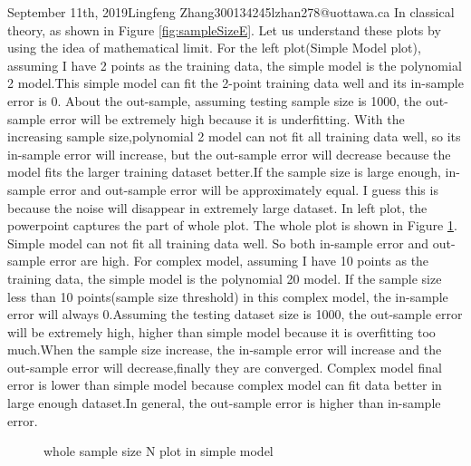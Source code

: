 \documentclass{article}
\begin{document}
\begin{lecture}{September 11th, 2019}{Lingfeng Zhang}{300134245}{lzhan278@uottawa.ca}
In classical theory, as shown in Figure \ref{fig:sampleSizeE}. Let us understand these plots by using the idea of mathematical limit. For the left plot(Simple Model plot), assuming I have 2 points as the training data, the simple model is the polynomial 2 model.This simple model can fit the 2-point training data well and its in-sample error is 0. About the out-sample, assuming testing sample size is 1000, the out-sample error will be extremely high because it is underfitting. With the increasing sample size,polynomial 2 model can not fit all training data well, so its in-sample error will increase, but the out-sample error will decrease because the model fits the larger training dataset better.If the sample size is large enough, in-sample error and out-sample error will be approximately equal. I guess this is because the noise will disappear in extremely large dataset. In left plot, the powerpoint captures the part of whole plot. The whole plot is shown in Figure \ref{fig:wholeSampleSizeE}. Simple model can not fit all training data well. So both in-sample error and out-sample error are high. For complex model, assuming I have 10 points as the training data, the simple model is the polynomial 20 model. If the sample size less than 10 points(sample size threshold) in this complex model, the in-sample error will always 0.Assuming the testing dataset size is 1000, the out-sample error will be extremely high, higher than simple model because it is overfitting too much.When the sample size increase, the in-sample error will increase and the out-sample error will decrease,finally they are converged. Complex model final error is lower than simple model because complex model can fit data better in large enough dataset.In general, the out-sample error is higher than in-sample error.

\begin{figure}[ht!]
\centering
{}
\caption{whole sample size N plot in simple model}
\label{fig:wholeSampleSizeE}
\end{figure}


\end{lecture}
\end{document}
